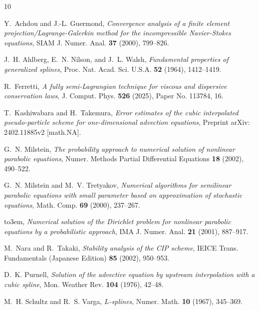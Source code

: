 \documentclass[10pt,a4paper,tbtags,leqno]{amsart}
\theoremstyle{definition}
\numberwithin{equation}{section}
\begin{document}
\providecommand{\bysame}{\leavevmode\hbox to3em{\hrulefill}\thinspace}
\providecommand{\MR}{\relax\ifhmode\unskip\space\fi MR }
\providecommand{\MRhref}[2]{%
  \href{http://www.ams.org/mathscinet-getitem?mr=#1}{#2}
}
\providecommand{\href}[2]{#2}
\begin{thebibliography}{10}

Y.~Achdou and J.-L. Guermond, \emph{Convergence analysis of a finite element projection/{L}agrange-{G}alerkin method for the incompressible {N}avier-{S}tokes equations}, SIAM J. Numer. Anal. \textbf{37} (2000), 799--826.

J.~H. Ahlberg, E.~N. Nilson, and J.~L. Walsh, \emph{Fundamental properties of generalized splines}, Proc. Nat. Acad. Sci. U.S.A. \textbf{52} (1964), 1412--1419.

R.~Ferretti, \emph{A fully semi-{L}agrangian technique for viscous and dispersive conservation laws}, J. Comput. Phys. \textbf{526} (2025), Paper No. 113784, 16.

T.~Kashiwabara and H.~Takemura, \emph{Error estimates of the cubic interpolated pseudo-particle scheme for one-dimensional advection equations}, Preprint arXiv: 2402.11885v2 [math.NA].

G.~N. Milstein, \emph{The probability approach to numerical solution of nonlinear parabolic equations}, Numer. Methods Partial Differential Equations \textbf{18} (2002), 490--522.

G.~N. Milstein and M.~V. Tretyakov, \emph{Numerical algorithms for semilinear parabolic equations with small parameter based on approximation of stochastic equations}, Math. Comp. \textbf{69} (2000), 237--267.

\bysame, \emph{Numerical solution of the {D}irichlet problem for nonlinear parabolic equations by a probabilistic approach}, IMA J. Numer. Anal. \textbf{21} (2001), 887--917.

M.~Nara and R.~Takaki, \emph{Stability analysis of the {CIP} scheme}, IEICE Trans. Fundamentals (Japanese Edition) \textbf{85} (2002), 950--953.

D.~K. Purnell, \emph{Solution of the advective equation by upstream interpolation with a cubic spline}, Mon. Weather Rev. \textbf{104} (1976), 42--48.

M.~H. Schultz and R.~S. Varga, \emph{{$L$}-splines}, Numer. Math. \textbf{10} (1967), 345--369.


\end{thebibliography}
\end{document}
